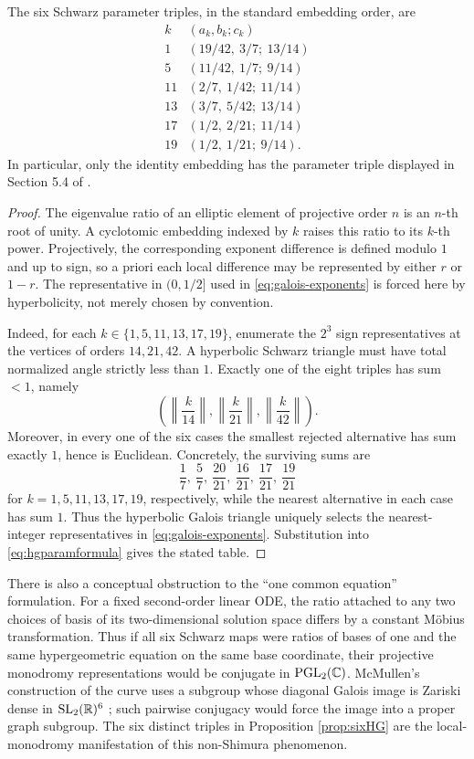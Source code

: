 \begin{proposition}\label{prop:sixHG}
The six Schwarz parameter triples, in the standard embedding order, are
\[
\begin{array}{c|c}
 k&(a_k,b_k;c_k)\\ \hline
 1&(19/42,\ 3/7;\ 13/14)\\
 5&(11/42,\ 1/7;\ 9/14)\\
 11&(2/7,\ 1/42;\ 11/14)\\
 13&(3/7,\ 5/42;\ 13/14)\\
 17&(1/2,\ 2/21;\ 11/14)\\
 19&(1/2,\ 1/21;\ 9/14).
\end{array}
\]
In particular, only the identity embedding has the parameter triple displayed in Section 5.4 of \cite{Mostaed2026}.
\end{proposition}
\begin{proof}
The eigenvalue ratio of an elliptic element of projective order $n$ is an $n$-th root of unity. A cyclotomic embedding indexed by $k$ raises this ratio to its $k$-th power. Projectively, the corresponding exponent difference is defined modulo $1$ and up to sign, so a priori each local difference may be represented by either $r$ or $1-r$. The representative in $(0,1/2]$ used in \eqref{eq:galois-exponents} is forced here by hyperbolicity, not merely chosen by convention.

Indeed, for each $k\in\{1,5,11,13,17,19\}$, enumerate the $2^3$ sign representatives at the vertices of orders $14,21,42$. A hyperbolic Schwarz triangle must have total normalized angle strictly less than $1$. Exactly one of the eight triples has sum $<1$, namely
\[
 \left(\left\|\frac{k}{14}\right\|,
       \left\|\frac{k}{21}\right\|,
       \left\|\frac{k}{42}\right\|\right).
\]
Moreover, in every one of the six cases the smallest rejected alternative has sum exactly $1$, hence is Euclidean. Concretely, the surviving sums are
\[
 \frac17,\ \frac57,\ \frac{20}{21},\ \frac{16}{21},\ \frac{17}{21},\ \frac{19}{21}
\]
for $k=1,5,11,13,17,19$, respectively, while the nearest alternative in each case has sum $1$. Thus the hyperbolic Galois triangle uniquely selects the nearest-integer representatives in \eqref{eq:galois-exponents}. Substitution into \eqref{eq:hgparamformula} gives the stated table.
\end{proof}

There is also a conceptual obstruction to the ``one common equation'' formulation. For a fixed second-order linear ODE, the ratio attached to any two choices of basis of its two-dimensional solution space differs by a constant Möbius transformation. Thus if all six Schwarz maps were ratios of bases of one and the same hypergeometric equation on the same base coordinate, their projective monodromy representations would be conjugate in $\mathrm{PGL}_2(\mathbb C)$. McMullen's construction of the curve uses a subgroup whose diagonal Galois image is Zariski dense in $\mathrm{SL}_2(\mathbb R)^6$ \cite[Sec.~5 and proof of Thm.~1.9]{McMullen2026}; such pairwise conjugacy would force the image into a proper graph subgroup. The six distinct triples in Proposition \ref{prop:sixHG} are the local-monodromy manifestation of this non-Shimura phenomenon.

